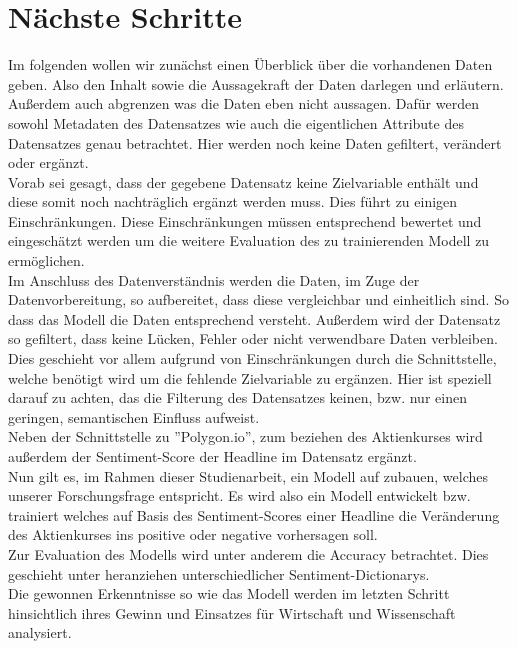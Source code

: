 \section*{Nächste Schritte}
Im folgenden wollen wir zunächst einen Überblick über die vorhandenen Daten geben. Also den Inhalt sowie die Aussagekraft der Daten darlegen und erläutern. Außerdem auch abgrenzen was die Daten eben nicht aussagen. Dafür werden sowohl Metadaten des Datensatzes wie auch die eigentlichen Attribute des Datensatzes genau betrachtet. Hier werden noch keine Daten gefiltert, verändert oder ergänzt.\\
Vorab sei gesagt, dass der gegebene Datensatz keine Zielvariable enthält und diese somit noch nachträglich ergänzt werden muss. Dies führt zu einigen Einschränkungen. Diese Einschränkungen müssen entsprechend bewertet und eingeschätzt werden um die weitere Evaluation des zu trainierenden Modell zu ermöglichen.\\
Im Anschluss des Datenverständnis werden die Daten, im Zuge der Datenvorbereitung, so aufbereitet, dass diese vergleichbar und einheitlich sind. So dass das Modell die Daten entsprechend versteht. Außerdem wird der Datensatz so gefiltert, dass keine Lücken, Fehler oder nicht verwendbare Daten verbleiben. Dies geschieht vor allem aufgrund von Einschränkungen durch die Schnittstelle, welche benötigt wird um die fehlende Zielvariable zu ergänzen. Hier ist speziell darauf zu achten, das die Filterung des Datensatzes keinen, bzw. nur einen geringen, semantischen Einfluss aufweist.\\
Neben der Schnittstelle zu ''Polygon.io'', zum beziehen des Aktienkurses wird außerdem der Sentiment-Score der Headline im Datensatz ergänzt.\\
Nun gilt es, im Rahmen dieser Studienarbeit, ein Modell auf zubauen, welches unserer Forschungsfrage entspricht. Es wird also ein Modell entwickelt bzw. trainiert welches auf Basis des Sentiment-Scores einer Headline die Veränderung des Aktienkurses ins positive oder negative vorhersagen soll.\\
Zur Evaluation des Modells wird unter anderem die Accuracy betrachtet. Dies geschieht unter heranziehen unterschiedlicher Sentiment-Dictionarys.\\
Die gewonnen Erkenntnisse so wie das Modell werden im letzten Schritt hinsichtlich ihres Gewinn und Einsatzes für Wirtschaft und Wissenschaft analysiert.